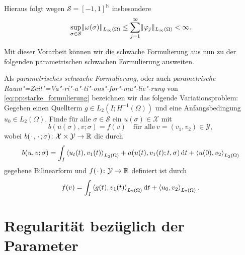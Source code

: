 Hieraus folgt wegen $\mathcal S = [-1, 1]^{\mathbb{N}}$ insbesondere
\begin{equation}
    \sup_{\sigma \in \mathcal S} \lVert\omega(\sigma)\rVert_{L_{\infty}(\Omega)} \leq \sum_{j = 1}^{\infty} \lVert\varphi_{j}\rVert_{L_{\infty}(\Omega)} < \infty.
\end{equation}

Mit dieser Vorarbeit können wir die schwache Formulierung aus  nun zu der folgenden parametrischen schwachen Formulierung ausweiten.


\begin{Definition}
\label{definition:cha3:param_schwache_formulierung}
    Als \emph{parametrisches schwache Formulierung}, oder auch \emph{parametrische Raum"=Zeit"=Va"-ri"-a"-ti"-ons"-for"-mu"-lie"-rung} von \eqref{eq:pp:starke_formulierung} bezeichnen wir das folgende Variationsproblem:
    Gegeben einen Quellterm $g \in L_{2}(I; H^{-1}(\Omega))$ und eine Anfangsbedingung $u_{0} \in L_{2}(\Omega)$.
    Finde für alle $\sigma \in \mathcal S$ ein $u(\sigma) \in \mathcal X$ mit
    \begin{equation}
        \label{eq:varprob}
        b(u(\sigma), v; \sigma) = f(v) \quad \text{für alle}~v = (v_{1}, v_{2}) \in \mathcal Y,
    \end{equation}
    wobei $b({\mkern2mu\cdot\mkern2mu}, {\mkern2mu\cdot\mkern2mu}; \sigma) \colon \mathcal X \times \mathcal Y \to \mathbb{R}$ die durch
    \begin{equation}
        \label{eq:buv}
        b(u, v; \sigma)
            = \int_{I} \left\langle u_{t}(t),v_{1}(t)\right\rangle_{L_{2}(\Omega)} + a(u(t), v_{1}(t); t, \sigma) \mathop{}\!\mathrm{d} t + \left\langle u(0),v_{2}\right\rangle_{L_{2}(\Omega)}
    \end{equation}
    gegebene Bilinearform und $f({\mkern2mu\cdot\mkern2mu}) \colon \mathcal Y \to \mathbb{R}$ definiert ist durch
    \begin{equation}
        \label{eq:var_all_f_wiederholung}
        f(v) = \int_{I} \left\langle g(t),v_{1}(t)\right\rangle_{L_{2}(\Omega)} \mathop{}\!\mathrm{d} t + \left\langle u_{0},v_{2}\right\rangle_{L_{2}(\Omega)}.
    \end{equation}
\end{Definition}



\section{Regularität bezüglich der Parameter} %
\label{sec:regularit_t_bez_glich_der_parameter}

